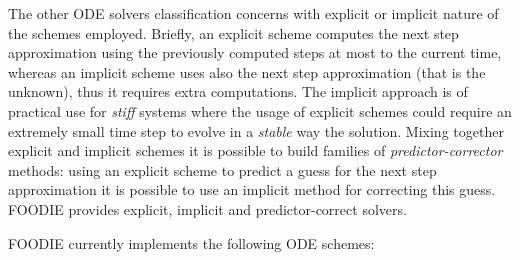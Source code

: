 The other ODE solvers classification concerns with explicit or implicit nature of the schemes employed. Briefly, an explicit scheme computes the next step approximation using the previously computed steps at most to the current time, whereas an implicit scheme uses also the next step approximation (that is the unknown), thus it requires extra computations. The implicit approach is of practical use for \emph{stiff} systems where the usage of explicit schemes could require an extremely small time step to evolve in a \emph{stable} way the solution. Mixing together explicit and implicit schemes it is possible to build families of \emph{predictor-corrector} methods: using an explicit scheme to predict a guess for the next step approximation it is possible to use an implicit method for correcting this guess. FOODIE provides explicit, implicit and predictor-correct solvers.

FOODIE currently implements the following ODE schemes:


